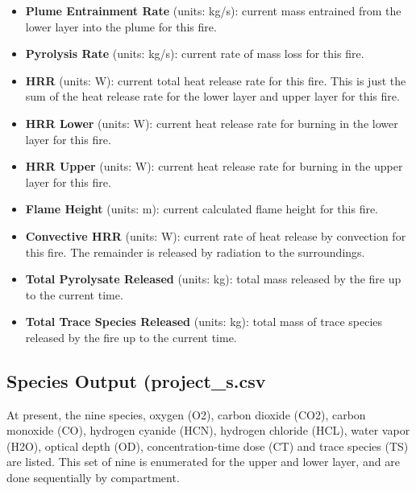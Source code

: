 \begin{itemize}
\item \textbf{Plume Entrainment Rate} (units: kg/s): current mass entrained from the lower layer into the plume for this fire.
\item \textbf{Pyrolysis Rate} (units: kg/s): current rate of mass loss for this fire.
\item \textbf{HRR} (units: W): current total heat release rate for this fire. This is just the sum of the heat release rate for the lower layer and upper layer for this fire.
\item \textbf{HRR Lower} (units: W): current heat release rate for burning in the lower layer for this fire.
\item \textbf{HRR Upper} (units: W):  current heat release rate for burning in the upper layer for this fire.
\item \textbf{Flame Height} (units: m): current calculated flame height for this fire.
\item \textbf{Convective HRR} (units: W): current rate of heat release by convection for this fire.  The remainder is released by radiation to the surroundings.
\item \textbf{Total Pyrolysate Released} (units: kg): total mass released by the fire up to the current time.
\item \textbf{Total Trace Species Released} (units: kg): total mass of trace species released by the fire up to the current time.
\end{itemize}

\subsection{Species Output (project\_s.csv}

At present, the nine species, oxygen (O2), carbon dioxide (CO2), carbon monoxide (CO),  hydrogen cyanide (HCN), hydrogen chloride (HCL), water vapor (H2O), optical depth (OD), concentration-time dose (CT) and trace species (TS) are listed. This set of nine is enumerated for the upper and lower layer, and are done sequentially by compartment.

